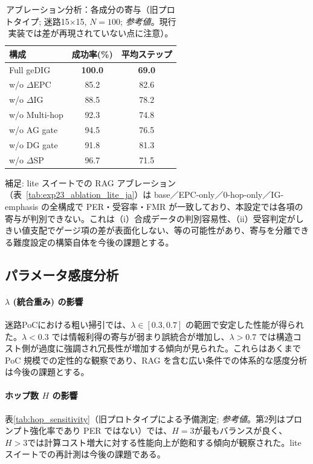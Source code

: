 \documentclass[ja=standard,xelatex]{bxjsarticle}
\begin{document}
\begin{table}[H]
\centering
\caption{アブレーション分析：各成分の寄与（旧プロトタイプ; 迷路15×15, $N{=}100$; \emph{参考値}。現行実装では差が再現されていない点に注意）。}
\label{tab:ablation}
\begin{tabular}{lcc}
\toprule
構成 & 成功率(\%) & 平均ステップ \\
\midrule
Full geDIG & \textbf{100.0} & \textbf{69.0} \\
w/o $\Delta$EPC & 85.2 & 82.6 \\
w/o $\Delta$IG & 88.5 & 78.2 \\
w/o Multi-hop & 92.3 & 74.8 \\
w/o AG gate & 94.5 & 76.5 \\
w/o DG gate & 91.8 & 81.3 \\
w/o $\Delta$SP & 96.7 & 71.5 \\
\bottomrule
\end{tabular}
\end{table}

\noindent 補足: lite スイートでの RAG アブレーション（表~\ref{tab:exp23_ablation_lite_ja}）は base／EPC-only／0-hop-only／IG-emphasis の全構成で PER・受容率・FMR が一致しており、本設定では各項の寄与が判別できない。これは（i）合成データの判別容易性、（ii）受容判定がしきい値支配でゲージ項の差が表面化しない、等の可能性があり、寄与を分離できる難度設定の構築自体を今後の課題とする。

\subsection{パラメータ感度分析}

\paragraph{$\lambda$ (統合重み) の影響}
迷路PoCにおける粗い掃引では、$\lambda \in [0.3, 0.7]$ の範囲で安定した性能が得られた。$\lambda < 0.3$ では情報利得の寄与が弱まり誤統合が増加し、$\lambda > 0.7$ では構造コスト側が過度に強調され冗長性が増加する傾向が見られた。これらはあくまで PoC 規模での定性的な観察であり、RAG を含む広い条件での体系的な感度分析は今後の課題とする。

\paragraph{ホップ数 $H$ の影響}
表\ref{tab:hop_sensitivity}（旧プロトタイプによる予備測定; \emph{参考値}。第2列はプロンプト強化率であり PER ではない）では、$H=3$が最もバランスが良く、$H>3$では計算コスト増大に対する性能向上が飽和する傾向が観察された。lite スイートでの再計測は今後の課題である。
\end{document}

